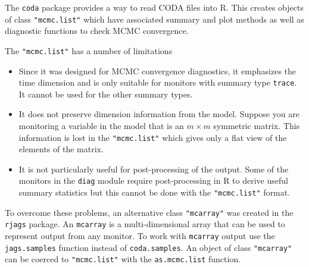 \documentclass[11pt, a4paper, titlepage]{report}
\begin{document}
The \texttt{coda} package provides a way to read CODA files into
R. This creates objects of class \texttt{"mcmc.list"} which have
associated summary and plot methods as well as diagnostic functions
to check MCMC convergence.

The \texttt{"mcmc.list"} has a number of limitations
\begin{itemize}
\item Since it was designed for MCMC convergence diagnostics, it
  emphasizes the time dimension and is only suitable for monitors with
  summary type \texttt{trace}. It cannot be used for the other summary
  types.
\item It does not preserve dimension information from the model.  Suppose
  you are monitoring a variable in the model that is an $m \times m$ symmetric
  matrix. This information is lost in the \texttt{"mcmc.list"} which gives
  only a flat view of the elements of the matrix.
\item It is not particularly useful for post-processing of the
  output. Some of the monitors in the \texttt{diag} module require
  post-processing in R to derive useful summary statistics but this
  cannot be done with the \texttt{"mcmc.list"} format.
\end{itemize}

To overcome these problems, an alternative class \texttt{"mcarray"}
was created in the \texttt{rjags} package. An \texttt{mcarray} is a
multi-dimensional array that can be used to represent output from any
monitor. To work with \texttt{mcarray} output use the
\texttt{jags.samples} function instead of \texttt{coda.samples}. An
object of class \texttt{"mcarray"} can be coerced to \texttt{"mcmc.list"}
with the \texttt{as.mcmc.list} function.





\end{document}
